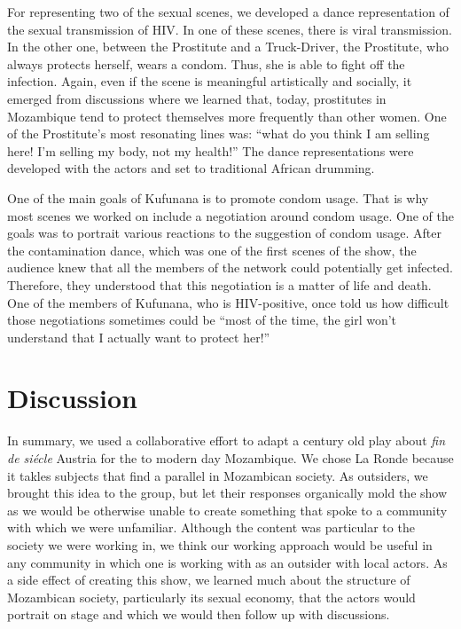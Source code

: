 \documentclass[article,twocolumn]{memoir}
\begin{document}
For representing two of the sexual scenes, we developed a dance representation
of the sexual transmission of HIV. In one of these scenes, there is viral
transmission. In the other one, between the Prostitute and a Truck-Driver, the
Prostitute, who always protects herself, wears a condom. Thus, she is able to
fight off the infection. Again, even if the scene is meaningful artistically and
socially, it emerged from discussions where we learned that, today, prostitutes
in Mozambique tend to protect themselves more frequently than other women. One
of the Prostitute's most resonating lines was: ``what do you think I am selling
here! I'm selling my body, not my health!'' The dance representations were
developed with the actors and set to traditional African drumming.

One of the main goals of Kufunana is to promote condom usage. That is why most
scenes we worked on include a negotiation around condom usage. One of the goals
was to portrait various reactions to the suggestion of condom usage. After the
contamination dance, which was one of the first scenes of the show, the
audience knew that all the members of the network could potentially get
infected. Therefore, they understood that this negotiation is a matter of life
and death. One of the members of Kufunana, who is HIV-positive, once told us
how difficult those negotiations sometimes could be ``most of the time, the
girl won't understand that I actually want to protect her!''

\chapter{Discussion}

In summary, we used a collaborative effort to adapt a century old play about
\textit{fin de si\'{e}cle} Austria for the to modern day Mozambique. We chose
La Ronde because it takles subjects that find a parallel in Mozambican society.
As outsiders, we brought this idea to the group, but let their responses
organically mold the show as we would be otherwise unable to create something
that spoke to a community with which we were unfamiliar. Although the content
was particular to the society we were working in, we think our working approach
would be useful in any community in which one is working with as an outsider
with local actors. As a side effect of creating this show, we learned much
about the structure of Mozambican society, particularly its sexual economy,
that the actors would portrait on stage and which we would then follow up with
discussions.
\end{document}
